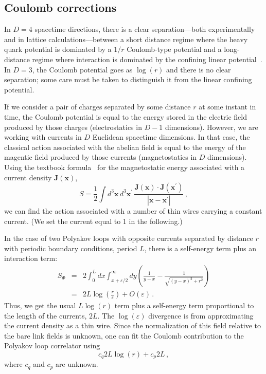 \documentclass[preprint,aps,prd]{revtex4-2}
\newcommand{\be}{\begin{equation}}
\newcommand{\eq}{\end{equation}}
\begin{document}
\subsection{Coulomb corrections}

In $D=4$ spacetime directions, there is a clear separation---both
experimentally and in lattice calculations---between a
short distance regime where the heavy quark potential is
dominated by a $1/r$ Coulomb-type potential and a
long-distance regime where interaction is dominated by the confining linear
potential~\cite{bali_static_2000,brambilla_effective-field_2005}.
In $D=3$, the Coulomb potential goes as $\log(r)$ and there is no 
clear separation; some care must be taken to distinguish it from
the linear confining potential.

If we consider a pair of charges separated by some
distance $r$ at some instant in time, the Coulomb potential is
equal to the energy stored in the electric
field produced by those charges (electrostatics in $D-1$
dimensions).  However, we are working
with currents in $D$ Euclidean spacetime dimensions.  In that case,
the classical action associated with the abelian field is equal to the
energy of the magentic field produced by those currents
(magnetostatics in $D$ dimensions).  Using the textbook
formula~\cite{jackson_classical_1975}
for the magnetostatic energy associated with a current density
$\mathbf{J}(\mathbf{x})$,
%
\be
S = \frac{1}{2} \int d^3\mathbf{x}\, d^3\mathbf{x}^\prime\,
\frac{\mathbf{J}(\mathbf{x}) \cdot
  \mathbf{J}(\mathbf{x}^\prime)}{
  \left| \mathbf{x}-\mathbf{x}^\prime\right|} \, ,
\eq
%
we can find the action associated with a number of thin wires
carrying a constant current. (We set the current equal to 1 in
the following.)

In the case of two Polyakov loops with opposite currents separated
by distance $r$ with periodic boundary conditions, period $L$,
there is a self-energy term plus an interaction term:
%
\begin{eqnarray}
S_\Phi &=& 2 \int_0^L dx \int_{x+\varepsilon/2}^\infty dy
\left(\frac{1}{y-x} -\frac{1}{\sqrt{(y-x)^2 + r^2}}\right) \\
  &=& 2 L \log\left(\frac{r}{\varepsilon}\right) + O(\varepsilon)\, .
\end{eqnarray}
%
Thus, we get the usual $L \log(r)$ term plus a
self-energy term proportional to the length
of the currents, $2L$.  The $\log(\varepsilon)$ divergence
is from approximating the current density as a thin wire.
Since the normalization
of this field relative to the bare link fields is
unknown, one can fit the Coulomb contribution to the
Polyakov loop correlator using
\be
       c_q 2 L \log(r) + c_p 2 L \, , \label{cpf}
\eq
where $c_q$ and $c_p$ are unknown.
\end{document}
